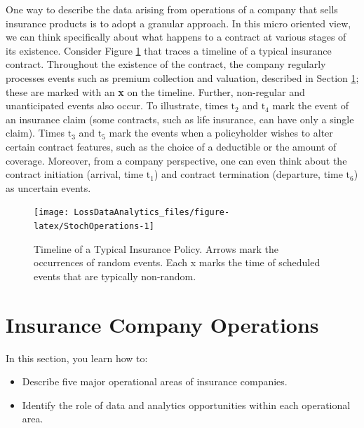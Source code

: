\documentclass[]{book}
\providecommand{\tightlist}{%
  \setlength{\itemsep}{0pt}\setlength{\parskip}{0pt}}
\theoremstyle{definition}
\theoremstyle{definition}
\theoremstyle{definition}
\theoremstyle{remark}
\begin{document}
One way to describe the data arising from operations of a company that
sells insurance products is to adopt a granular approach. In this micro
oriented view, we can think specifically about what happens to a
contract at various stages of its existence. Consider Figure
\ref{fig:StochOperations} that traces a timeline of a typical insurance
contract. Throughout the existence of the contract, the company
regularly processes events such as premium collection and valuation,
described in Section \ref{sec:PredModApps}; these are marked with an
\textbf{x} on the timeline. Further, non-regular and unanticipated
events also occur. To illustrate, times \(\mathrm{t}_2\) and
\(\mathrm{t}_4\) mark the event of an insurance claim (some contracts,
such as life insurance, can have only a single claim). Times
\(\mathrm{t}_3\) and \(\mathrm{t}_5\) mark the events when a
policyholder wishes to alter certain contract features, such as the
choice of a deductible or the amount of coverage. Moreover, from a
company perspective, one can even think about the contract initiation
(arrival, time \(\mathrm{t}_1\)) and contract termination (departure,
time \(\mathrm{t}_6\)) as uncertain events.





\begin{figure}

{\centering \texttt{[image: LossDataAnalytics\_files/figure-latex/StochOperations-1]} 

}

\caption{Timeline of a Typical Insurance Policy. Arrows
mark the occurrences of random events. Each x marks the time of
scheduled events that are typically non-random.}\label{fig:StochOperations}
\end{figure}

\section{Insurance Company Operations}\label{sec:PredModApps}

In this section, you learn how to:

\begin{itemize}
\tightlist
\item
  Describe five major operational areas of insurance companies.
\item
  Identify the role of data and analytics opportunities within each
  operational area.
\end{itemize}
\end{document}
